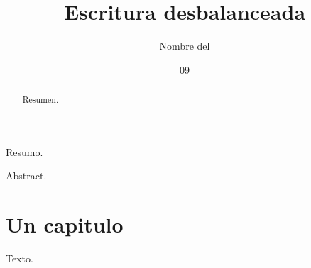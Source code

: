 \documentclass[dsc,spanish,rascunhoficha]{ufrj}
\title{Escritura desbalanceada}
\author{Nombre del}{Autor}
\date{09}{2026}
\begin{document}
  \maketitle
  \frontmatter
  \begin{brazilianabstract}Resumo.\end{brazilianabstract}
  \begin{foreignabstract}Abstract.\end{foreignabstract}
  \begin{abstract}Resumen.\end{abstract}
  \tableofcontents
  \mainmatter
  \chapter{Un capitulo}
  Texto.
\end{document}
